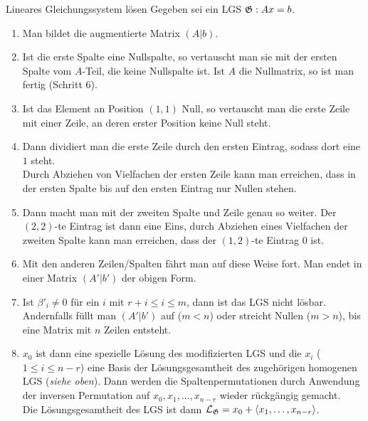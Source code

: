 \begin{Prozedur}{Lineares Gleichungssystem lösen}
    Gegeben sei ein LGS $\mathfrak{G}: Ax = b$.
    \begin{enumerate}
        \item Man bildet die augmentierte Matrix $(A|b)$.
        
        \item Ist die erste Spalte eine Nullspalte, so vertauscht man sie mit
        der ersten Spalte vom $A$-Teil, die keine Nullspalte ist.
        Ist $A$ die Nullmatrix, so ist man fertig (Schritt 6).
        
        \item Ist das Element an Position $(1, 1)$ Null, so vertauscht man die
        erste Zeile mit einer Zeile, an deren erster Position keine Null steht.
        
        \item Dann dividiert man die erste Zeile durch den ersten
        Eintrag, sodass dort eine $1$ steht. \\
        Durch Abziehen von Vielfachen der ersten Zeile kann man
        erreichen, dass in der ersten Spalte bis auf den ersten Eintrag nur
        Nullen stehen.
        
        \item Dann macht man mit der zweiten Spalte und Zeile genau so weiter.
        Der $(2, 2)$-te Eintrag ist dann eine Eins, durch Abziehen
        eines Vielfachen der zweiten Spalte kann man erreichen, dass der
        $(1, 2)$-te Eintrag $0$ ist.
        
        \item Mit den anderen Zeilen/Spalten fährt man auf diese Weise fort.
        Man endet in einer Matrix $(A'|b')$ der obigen Form.
        
        \item Ist $\beta'_i \not= 0$ für ein $i$ mit $r + i \le i \le m$, dann
        ist das LGS nicht lösbar.
        Andernfalls füllt man $(A'|b')$ auf ($m < n$) oder streicht Nullen
        ($m > n$), bis eine Matrix mit $n$ Zeilen entsteht.
        
        \item $x_0$ ist dann eine spezielle Lösung des modifizierten LGS
        und die $x_i$ ($1 \le i \le n - r$) eine Basis der Lösungsgesamtheit
        des zugehörigen homogenen LGS (\emph{siehe oben}).
        Dann werden die Spaltenpermutationen durch Anwendung der inversen
        Permutation auf $x_0, x_1, \ldots, x_{n-r}$ wieder rückgängig
        gemacht. \\
        Die Lösungsgesamtheit des LGS  ist dann
        $\mathcal{L}_{\mathfrak{G}} = x_0 + \langle x_1, \ldots, x_{n-r} \rangle$.
    \end{enumerate} 
\end{Prozedur}

